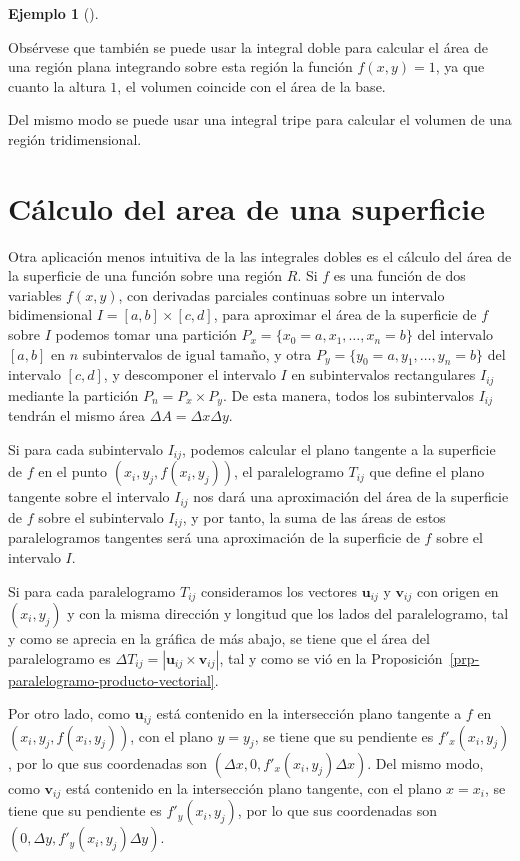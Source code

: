 \documentclass[
  a4paper,
]{scrreport}
\theoremstyle{definition}
\newtheorem{example}{Ejemplo}[chapter]
\theoremstyle{plain}
\theoremstyle{definition}
\theoremstyle{definition}
\theoremstyle{plain}
\theoremstyle{plain}
\theoremstyle{remark}
\begin{document}
\begin{example}[]
\begin{tcolorbox}
Obsérvese que también se puede usar la integral doble para calcular el
área de una región plana integrando sobre esta región la función
\(f(x,y)=1\), ya que cuanto la altura \(1\), el volumen coincide con el
área de la base.

Del mismo modo se puede usar una integral tripe para calcular el volumen
de una región tridimensional.

\end{tcolorbox}

\section{Cálculo del area de una
superficie}\label{cuxe1lculo-del-area-de-una-superficie}

Otra aplicación menos intuitiva de la las integrales dobles es el
cálculo del área de la superficie de una función sobre una región \(R\).
Si \(f\) es una función de dos variables \(f(x,y)\), con derivadas
parciales continuas sobre un intervalo bidimensional
\(I=[a,b]\times[c,d]\), para aproximar el área de la superficie de \(f\)
sobre \(I\) podemos tomar una partición
\(P_x=\{x_0=a,x_1,\ldots, x_n=b\}\) del intervalo \([a,b]\) en \(n\)
subintervalos de igual tamaño, y otra
\(P_y=\{y_0=a,y_1,\ldots, y_n=b\}\) del intervalo \([c,d]\), y
descomponer el intervalo \(I\) en subintervalos rectangulares \(I_{ij}\)
mediante la partición \(P_n=P_x\times P_y\). De esta manera, todos los
subintervalos \(I_{ij}\) tendrán el mismo área
\(\Delta A = \Delta x\Delta y\).

Si para cada subintervalo \(I_{ij}\), podemos calcular el plano tangente
a la superficie de \(f\) en el punto \((x_i, y_j, f(x_i,y_j))\), el
paralelogramo \(T_{ij}\) que define el plano tangente sobre el intervalo
\(I_{ij}\) nos dará una aproximación del área de la superficie de \(f\)
sobre el subintervalo \(I_{ij}\), y por tanto, la suma de las áreas de
estos paralelogramos tangentes será una aproximación de la superficie de
\(f\) sobre el intervalo \(I\).

Si para cada paralelogramo \(T_{ij}\) consideramos los vectores
\(\mathbf{u}_{ij}\) y \(\mathbf{v}_{ij}\) con origen en \((x_i, y_j)\) y
con la misma dirección y longitud que los lados del paralelogramo, tal y
como se aprecia en la gráfica de más abajo, se tiene que el área del
paralelogramo es
\(\Delta T_{ij} = |\mathbf{u}_{ij}\times\mathbf{v}_{ij}|\), tal y como
se vió en la Proposición~\ref{prp-paralelogramo-producto-vectorial}.

Por otro lado, como \(\mathbf{u}_{ij}\) está contenido en la
intersección plano tangente a \(f\) en \((x_i,y_j,f(x_i,y_j))\), con el
plano \(y=y_j\), se tiene que su pendiente es \(f'_x(x_i,y_j)\), por lo
que sus coordenadas son \((\Delta x, 0, f'_x(x_i,y_j)\Delta x)\). Del
mismo modo, como \(\mathbf{v}_{ij}\) está contenido en la intersección
plano tangente, con el plano \(x=x_i\), se tiene que su pendiente es
\(f'_y(x_i,y_j)\), por lo que sus coordenadas son
\((0, \Delta y, f'_y(x_i,y_j)\Delta y)\).


\end{example}
\end{document}
